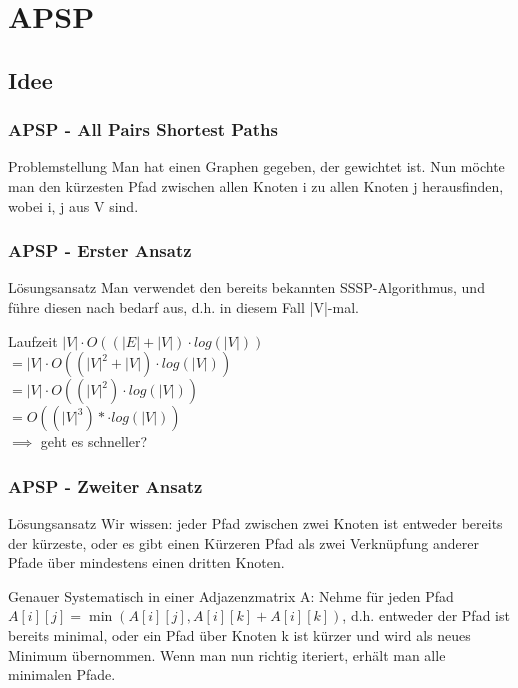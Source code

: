 \section{APSP} 

\subsection{Idee} 

\begin{frame}
\frametitle{APSP - All Pairs Shortest Paths}
\begin{block}{Problemstellung}
Man hat einen Graphen gegeben, der gewichtet ist. Nun möchte man den kürzesten Pfad zwischen allen Knoten i zu allen Knoten j herausfinden, wobei i, j aus V sind.
\end{block}
\end{frame}


\begin{frame}
\frametitle{APSP - Erster Ansatz}
\begin{block}{Lösungsansatz}
Man verwendet den bereits bekannten SSSP-Algorithmus, und führe diesen nach bedarf aus, d.h. in diesem Fall |V|-mal.
\end{block}

\begin{block}{Laufzeit}
$|V| \cdot O ((|E| + |V|) \cdot log(|V|))$\\$
= |V| \cdot O ((|V|^2 + |V|) \cdot log(|V|))$\\$
= |V| \cdot O ((|V|^2) \cdot log(|V|)) $\\$
= O ((|V|^3) *\cdot log(|V|))$\\
$\implies$ geht es schneller?
\end{block}
\end{frame}


\begin{frame}
\frametitle{APSP - Zweiter Ansatz}
\begin{block}{Lösungsansatz}
Wir wissen: jeder Pfad zwischen zwei Knoten ist entweder bereits der kürzeste, oder es gibt einen Kürzeren Pfad als zwei Verknüpfung anderer Pfade über mindestens einen dritten Knoten.
\end{block}

\begin{block}{Genauer}
Systematisch in einer Adjazenzmatrix A:
Nehme für jeden Pfad $A[i][j] = \min\left(A[i][j], A[i][k] + A[i][k]\right)$, d.h. entweder der Pfad ist bereits minimal, oder ein Pfad über Knoten k ist kürzer und wird als neues Minimum übernommen.
Wenn man nun richtig iteriert, erhält man alle minimalen Pfade.
\end{block}
\end{frame}

